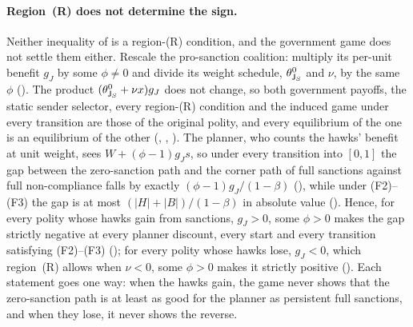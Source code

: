 \paragraph{Region~(R) does not determine the sign.}
Neither inequality of  is a region-(R)
condition, and the government game does not settle them either. Rescale the
pro-sanction coalition: multiply its per-unit benefit $g_J$ by some $\phi\ne0$
and divide its weight schedule, $\theta^0_{\mathsf{J}_S}$ and $\nu$, by the same
$\phi$ (). The product $(\theta^0_{\mathsf{J}_S}+\nu x)g_J$ does not
change, so both government payoffs, the static sender selector, every
region-(R) condition and the induced game under every transition are those of
the original polity, and every equilibrium of the one is an equilibrium of the
other (, ,
). The planner, who counts the hawks' benefit at
unit weight, sees $W+(\phi-1)g_Js$, so under every transition into $[0,1]$ the
gap between the zero-sanction path and the corner path of full sanctions
against full non-compliance falls by
exactly $(\phi-1)g_J/(1-\beta)$ (), while under
\textup{(F2)--(F3)} the gap is at most $(|H|+|B|)/(1-\beta)$ in absolute value
(). Hence, for every polity whose hawks gain from
sanctions, $g_J>0$, some $\phi>0$ makes the gap strictly negative at every planner
discount, every start and every transition satisfying \textup{(F2)--(F3)}
(); for every polity whose hawks lose,
$g_J<0$, which region~(R) allows when $\nu<0$, some $\phi>0$ makes it strictly
positive (). Each statement goes one
way: when the hawks gain, the game never shows that the zero-sanction path
is at least as good for the planner as persistent full sanctions, and when
they lose, it never shows the reverse.

